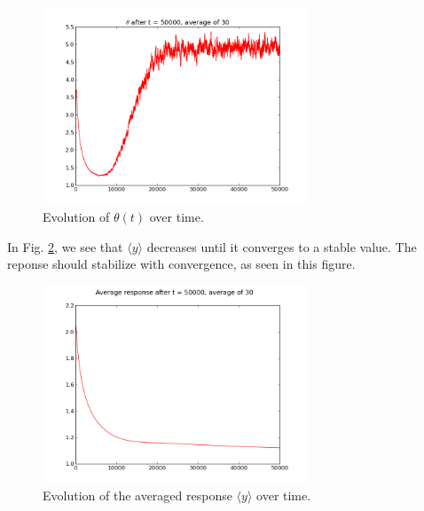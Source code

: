 \begin{figure}[h]
\centering
\includegraphics[width=0.7\textwidth]{../ex2/theta_t50000_mean_results.png}
\caption{Evolution of $\theta (t)$ over time.}
\label{fig:theta_over_time}
\end{figure}
In Fig. \ref{fig:response_over_time}, we see that $\langle y\rangle$ decreases until it converges to a stable value. The reponse should stabilize with convergence, as seen in this figure. 
\begin{figure}[h]
\centering
\includegraphics[width=0.7\textwidth]{../ex2/resp_avg_t50000_mean_results.png}
\caption{Evolution of the averaged response $\langle y\rangle$ over time.}
\label{fig:response_over_time}
\end{figure}

